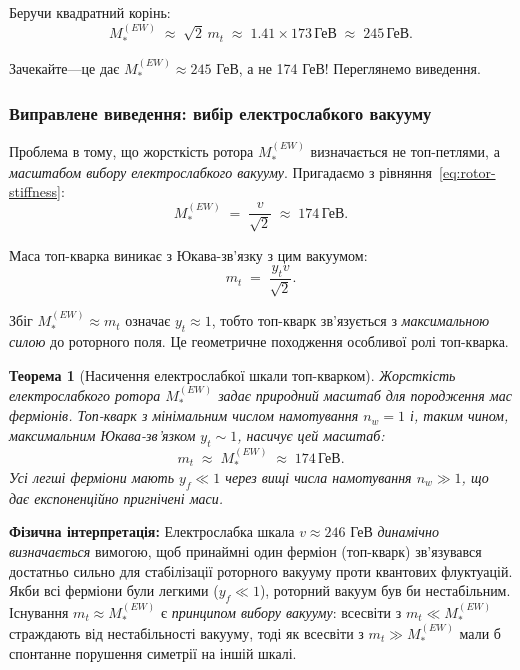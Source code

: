 \documentclass[11pt,a4paper]{article}
\theoremstyle{definition}
\theoremstyle{plain}
\newtheorem{theorem}{Теорема}
\theoremstyle{remark}
\begin{document}
Беручи квадратний корінь:
\begin{equation}
\boxed{M_*^{(EW)} \;\approx\; \sqrt{2}\,m_t \;\approx\; 1{.}41 \times 173\,\text{ГеВ} \;\approx\; 245\,\text{ГеВ}.}
\label{eq:mt-connection-wrong}
\end{equation}

Зачекайте---це дає $M_*^{(EW)} \approx 245$ ГеВ, а не 174 ГеВ! Переглянемо виведення.

\subsubsection{Виправлене виведення: вибір електрослабкого вакууму}

Проблема в тому, що жорсткість ротора $M_*^{(EW)}$ визначається не топ-петлями, а \emph{масштабом вибору електрослабкого вакууму}. Пригадаємо з рівняння~\eqref{eq:rotor-stiffness}:
\begin{equation}
M_*^{(EW)} \;=\; \frac{v}{\sqrt{2}} \;\approx\; 174\,\text{ГеВ}.
\end{equation}

Маса топ-кварка виникає з Юкава-зв'язку з цим вакуумом:
\begin{equation}
m_t \;=\; \frac{y_t v}{\sqrt{2}}.
\end{equation}

Збіг $M_*^{(EW)} \approx m_t$ означає $y_t \approx 1$, тобто топ-кварк зв'язується з \emph{максимальною силою} до роторного поля. Це геометричне походження особливої ролі топ-кварка.

\begin{theorem}[Насичення електрослабкої шкали топ-кварком]
Жорсткість електрослабкого ротора $M_*^{(EW)}$ задає природний масштаб для породження мас ферміонів. Топ-кварк з мінімальним числом намотування $n_w = 1$ і, таким чином, максимальним Юкава-зв'язком $y_t \sim 1$, насичує цей масштаб:
\begin{equation}
m_t \;\approx\; M_*^{(EW)} \;\approx\; 174\,\text{ГеВ}.
\end{equation}
Усі легші ферміони мають $y_f \ll 1$ через вищі числа намотування $n_w \gg 1$, що дає експоненційно пригнічені маси.
\end{theorem}

\textbf{Фізична інтерпретація:} Електрослабка шкала $v \approx 246$ ГеВ \emph{динамічно визначається} вимогою, щоб принаймні один ферміон (топ-кварк) зв'язувався достатньо сильно для стабілізації роторного вакууму проти квантових флуктуацій. Якби всі ферміони були легкими ($y_f \ll 1$), роторний вакуум був би нестабільним. Існування $m_t \approx M_*^{(EW)}$ є \emph{принципом вибору вакууму}: всесвіти з $m_t \ll M_*^{(EW)}$ страждають від нестабільності вакууму, тоді як всесвіти з $m_t \gg M_*^{(EW)}$ мали б спонтанне порушення симетрії на іншій шкалі.
\end{document}
